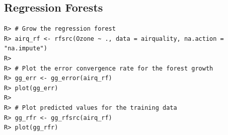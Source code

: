 \documentclass[nojss]{jss}\usepackage[]{graphicx}\usepackage[]{color}
\makeatletter
\newenvironment{kframe}{%
 \def\at@end@of@kframe{}%
 \ifinner\ifhmode%
  \def\at@end@of@kframe{\end{minipage}}%
  \begin{minipage}{\columnwidth}%
 \fi\fi%
 \def\FrameCommand##1{\hskip\@totalleftmargin \hskip-\fboxsep
 \colorbox{shadecolor}{##1}\hskip-\fboxsep
     \hskip-\linewidth \hskip-\@totalleftmargin \hskip\columnwidth}%
 \MakeFramed {\advance\hsize-\width
   \@totalleftmargin\z@ \linewidth\hsize
   \@setminipage}}%
 {\par\unskip\endMakeFramed%
 \at@end@of@kframe}
\newenvironment{knitrout}{}{} %
\makeatother
\begin{document}
\subsection{Regression Forests}

\begin{knitrout}\footnotesize
{}\color{fgcolor}\begin{kframe}
\begin{verbatim}
R> # Grow the regression forest
R> airq_rf <- rfsrc(Ozone ~ ., data = airquality, na.action = "na.impute")
R> 
R> # Plot the error convergence rate for the forest growth
R> gg_err <- gg_error(airq_rf)
R> plot(gg_err)
R> 
R> # Plot predicted values for the training data
R> gg_rfr <- gg_rfsrc(airq_rf)
R> plot(gg_rfr)
\end{verbatim}
\end{kframe}
\end{knitrout}

\end{document}
